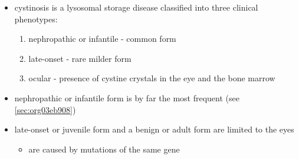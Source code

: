 \documentclass{scrartcl}
\begin{document}
\begin{itemize}
\item cystinosis is a lysosomal storage disease classified into three
clinical phenotypes:
\begin{enumerate}
\item nephropathic or infantile - common form
\item late-onset - rare milder form
\item ocular - presence of cystine crystals in the eye and the bone
marrow
\end{enumerate}
\item nephropathic or infantile form is by far the most frequent (see \ref{sec:org03eb908})
\item late-onset or juvenile form and a benign or adult form are limited to the eyes
\begin{itemize}
\item are caused by mutations of the same gene
\end{itemize}
\end{itemize}
\end{document}
